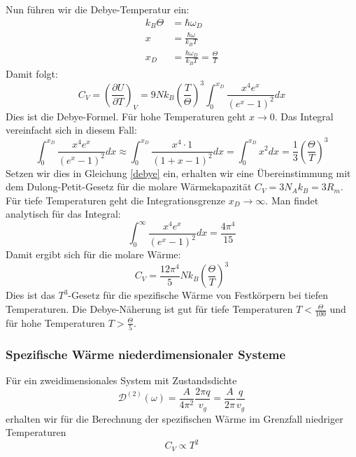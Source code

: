 \documentclass[11pt]{article}
\begin{document}
Nun führen wir die Debye-Temperatur ein:
\begin{equation}
  \begin{align}
    k_B\Theta&=\hbar\omega_D \\
    x&=\frac{\hbar\omega}{k_BT}\\
    x_D&=\frac{\hbar\omega_D}{k_BT}=\frac{\Theta}{T}
  \end{align}
\end{equation}
Damit folgt:
\begin{equation}\label{debye}
  C_V=\left(\frac{\partial U}{\partial T}\right)_V=9Nk_B\left(\frac{T}{\Theta}
  \right)^3\int_0^{x_D}\frac{x^4e^x}{(e^x-1)^2}dx
\end{equation}
Dies ist die Debye-Formel. Für hohe Temperaturen geht $x \to 0$. Das Integral
vereinfacht sich in diesem Fall:
\begin{equation}
  \int_0^{x_D}\frac{x^4e^x}{(e^x-1)^2}dx \approx \int_0^{x_D}\frac{x^4\cdot 1}
  {(1+x-1)^2}dx = \int_0^{x_D}x^2dx=\frac{1}{3}\left(\frac{\Theta}{T}\right)^3
\end{equation}
Setzen wir dies in Gleichung \ref{debye} ein, erhalten wir eine Übereinstimmung
mit dem Dulong-Petit-Gesetz für die molare Wärmekapazität $C_V=3N_Ak_B=3R_m$.
Für tiefe Temperaturen geht die Integrationsgrenze $x_D\to\infty$. Man findet
analytisch für das Integral:
\begin{equation}
  \int_0^\infty\frac{x^4e^x}{(e^x-1)^2}dx=\frac{4\pi^4}{15}
\end{equation}
Damit ergibt sich für die molare Wärme:
\begin{equation}
  C_V=\frac{12\pi^4}{5}Nk_B\left(\frac{\Theta}{T}\right)^3
\end{equation}
Dies ist das $T^3$-Gesetz für die spezifische Wärme von Festkörpern bei tiefen
Temperaturen. Die Debye-Näherung ist gut für tiefe Temperaturen $T<\frac{\Theta}
{100}$ und für hohe Temperaturen $T>\frac{\Theta}{5}$.
\subsubsection{Spezifische Wärme niederdimensionaler Systeme}
Für ein zweidimensionales System mit Zustandsdichte
\begin{equation}
  \mathcal{D}^{(2)}(\omega)=\frac{A}{4\pi^2}\frac{2\pi q}{v_g}=\frac{A}{2\pi}
  \frac{q}{v_g}
\end{equation}
erhalten wir für die Berechnung der spezifischen Wärme im Grenzfall niedriger
Temperaturen
\begin{equation}
  C_V \propto T^2
\end{equation}
\end{document}
